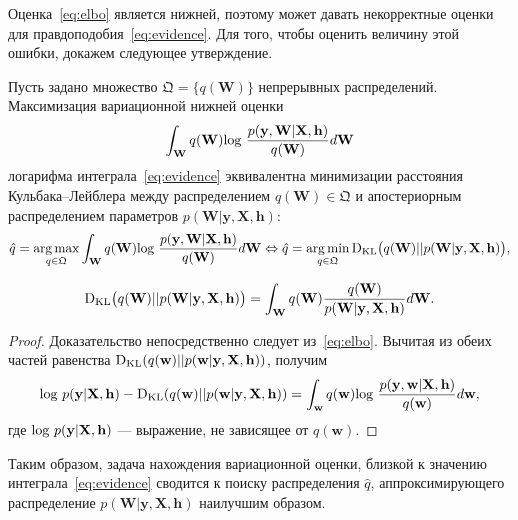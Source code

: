 Оценка~\eqref{eq:elbo} является нижней, поэтому может давать некорректные оценки для правдоподобия~\eqref{eq:evidence}. Для того, чтобы оценить величину этой ошибки, докажем следующее утверждение.

\begin{utv}
\label{st:st1} Пусть задано множество $\mathfrak{Q} = \{q(\mathbf{W})\}$ непрерывных распределений. Максимизация вариационной нижней оценки $$\int_{\mathbf{W}} q(\mathbf{W})\textnormal{log}~\frac{p(\mathbf{y},\mathbf{W}|\mathbf{X},\mathbf{h})}{q(\mathbf{W})}d\mathbf{W}$$  логарифма интеграла~\eqref{eq:evidence}  эквивалентна минимизации расстояния Кульбака--Лейблера между распределением $q(\mathbf{W}) \in \mathfrak{Q}$ и апостериорным распределением параметров $p(\mathbf{W}|\mathbf{y}, \mathbf{X}, \mathbf{h})$:
\begin{equation}
\label{eq:optim}
    \hat{q} = \operatorname*{arg\,max}_{q \in \mathfrak{Q}} \int_{\mathbf{W}} q(\mathbf{W})\textnormal{log}~\frac{p(\mathbf{y},\mathbf{W}|\mathbf{X},\mathbf{h})}{q(\mathbf{W})}d\mathbf{W} \Leftrightarrow 	
    \hat{q} = \operatorname*{arg\,min}_{q \in \mathfrak{Q}} \textnormal{D}_\textnormal{KL}  \bigl(q(\mathbf{W})||p(\mathbf{W}|\mathbf{y}, \mathbf{X}, \mathbf{h})\bigr),
\end{equation}

\[
	\textnormal{D}_\textnormal{KL}  \bigl(q(\mathbf{W})||p(\mathbf{W}|\mathbf{y}, \mathbf{X}, \mathbf{h})\bigr) =  \int_\mathbf{W} q(\mathbf{W}) \frac{q(\mathbf{W})}{p(\mathbf{W}|\mathbf{y}, \mathbf{X}, \mathbf{h})} d\mathbf{W}.
\]
\end{utv}


\begin{proof}
Доказательство непосредственно следует из~\eqref{eq:elbo}. Вычитая из обеих частей равенства $\textnormal{D}_\textnormal{KL}  (q(\mathbf{w})||p(\mathbf{w}|\mathbf{y}, \mathbf{X},\mathbf{h}))$, получим
\[
\textnormal{log}~p(\mathbf{y}|\mathbf{X},\mathbf{h}) - \textnormal{D}_\textnormal{KL}  (q(\mathbf{w})||p(\mathbf{w}|\mathbf{y}, \mathbf{X},\mathbf{h}))  = \int_{\mathbf{w}} q(\mathbf{w})\textnormal{log}~\frac{p(\mathbf{y},\mathbf{w}|\mathbf{X},\mathbf{h})}{q(\mathbf{w})}d\mathbf{w},
\]
где $\textnormal{log}~p(\mathbf{y}|\mathbf{X},\mathbf{h})$ --- выражение, не зависящее от $q(\mathbf{w})$.
\end{proof}



Таким образом, задача нахождения вариационной оценки, близкой к значению интеграла~\eqref{eq:evidence} сводится к поиску распределения $\hat{q}$, аппроксимирующего распределение $p(\mathbf{W}|\mathbf{y}, \mathbf{X}, \mathbf{h})$ наилучшим образом.

